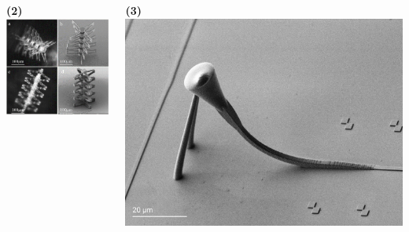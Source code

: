 \documentclass[aspectratio=169]{beamer}
\begin{document}
\begin{frame}
\begin{columns}[c]
{\begin{minipage}[t]{0.45 \textwidth}
    \end{minipage}
    \hfill
    \begin{minipage}[t]{0.45 \textwidth}
        \textbf{(2)} \includegraphics[width = \linewidth]{fig/4d_microrobot.png}
    \end{minipage}
    \begin{minipage}[t]{0.45 \textwidth}
        \textbf{(3)} \includegraphics[width = \linewidth]{fig/Freeform-3D-fiber-to-chip-coupler-Gallery.jpg}
    \end{minipage}
}
\end{columns}
\end{frame}
\end{document}

